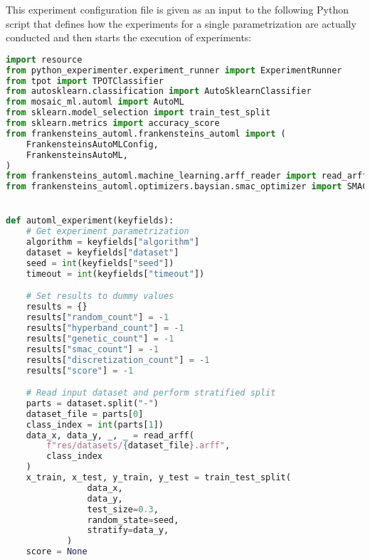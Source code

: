 This experiment configuration file is given as an input to the following Python script that defines how the experiments for a single parametrization are actually conducted and then starts the execution of experiments:
\begin{lstlisting}[language=Python]
import resource
from python_experimenter.experiment_runner import ExperimentRunner
from tpot import TPOTClassifier
from autosklearn.classification import AutoSklearnClassifier
from mosaic_ml.automl import AutoML
from sklearn.model_selection import train_test_split
from sklearn.metrics import accuracy_score
from frankensteins_automl.frankensteins_automl import (
    FrankensteinsAutoMLConfig,
    FrankensteinsAutoML,
)
from frankensteins_automl.machine_learning.arff_reader import read_arff
from frankensteins_automl.optimizers.baysian.smac_optimizer import SMAC


def automl_experiment(keyfields):
    # Get experiment parametrization
    algorithm = keyfields["algorithm"]
    dataset = keyfields["dataset"]
    seed = int(keyfields["seed"])
    timeout = int(keyfields["timeout"])

    # Set results to dummy values
    results = {}
    results["random_count"] = -1
    results["hyperband_count"] = -1
    results["genetic_count"] = -1
    results["smac_count"] = -1
    results["discretization_count"] = -1
    results["score"] = -1

    # Read input dataset and perform stratified split
    parts = dataset.split("-")
    dataset_file = parts[0]
    class_index = int(parts[1])
    data_x, data_y, _, _ = read_arff(
        f"res/datasets/{dataset_file}.arff",
        class_index 
    )
    x_train, x_test, y_train, y_test = train_test_split(
                data_x,
                data_y,
                test_size=0.3,
                random_state=seed,
                stratify=data_y,
            )
    score = None


\end{lstlisting}
